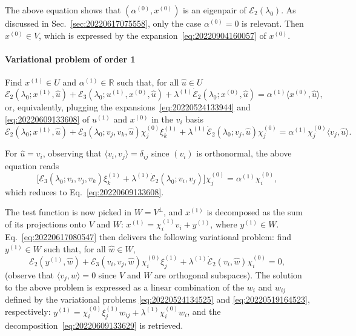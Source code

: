 \documentclass[12pt, final]{scrartcl}
\theoremstyle{definition}
\newcommand{\E}{\mathcal E}
\newcommand{\order}[2][1]{#2^{(#1)}}
\newcommand{\reals}{\mathbb{R}}
\begin{document}
The above equation shows that $(\order[0]\alpha, \order[0]x)$ is an eigenpair of $\E_2(\lambda_0)$. As discussed in
Sec.~\ref{sec:20220617075558}, only the case $\order[0]\alpha = 0$ is relevant. Then $\order[0]x \in V$, which is
expressed by the expansion~\eqref{eq:20220904160057} of $\order[0]x$.

\paragraph{Variational problem of order 1} Find $\order[1]x \in U$ and $\order[1]\alpha\in\reals$ such
that, for all $\hat{u} \in U$
\begin{equation}
  \label{eq:20220609131953}
  \E_2(\lambda_0; \order[1]x, \hat{u}) + \E_3(\lambda_0; \order[1]u, \order[0]x, \hat{u}) + \order[1]\lambda \dot{\E}_2(\lambda_0; \order[0]x, \hat{u})
  = \order[1]\alpha \langle \order[0]x, \hat{u} \rangle,
\end{equation}
or, equivalently, plugging the expansions~\eqref{eq:20220524133944} and \eqref{eq:20220609133608} of $\order[1]u$ and
$\order[0]x$ in the $v_i$ basis
\begin{equation}
  \label{eq:20220617080547}
  \E_2(\lambda_0; \order[1]x, \hat{u}) + \E_3(\lambda_0; v_j, v_k, \hat{u}) \order[0]{\chi_j} \order[1]{\xi_k} + \order[1]\lambda \dot{\E}_2(\lambda_0; v_j, \hat{u}) \order[0]{\chi_j}
  = \order[1]\alpha \order[0]{\chi_j} \langle v_j, \hat{u} \rangle.
\end{equation}

For $\hat{u} = v_i$, observing that $\langle v_i, v_j \rangle = \delta_{ij}$ since $(v_i)$ is orthonormal, the above
equation reads
\begin{equation}
  \bigl[\E_3(\lambda_0; v_i, v_j, v_k) \order[1]{\xi_k} + \order[1]\lambda \dot{\E}_2(\lambda_0; v_i, v_j)\bigr] \order[0]{\chi_j} = \order[1]\alpha \order[0]{\chi_i},
\end{equation}
which reduces to Eq.~\eqref{eq:20220609133608}.

The test function is now picked in $W = V^\perp$, and $\order[1]x$ is decomposed as the sum of its projections onto $V$
and $W$: $\order[1]x = \order[1]{\chi_i} v_i + \order[1]{y}$, where $\order[1]y \in W$. Eq.~\eqref{eq:20220617080547}
then delivers the following variational problem: find $\order[1]y \in W$ such that, for all $\hat{w} \in W$,
\begin{equation}
  \E_2(\order[1]y, \hat{w}) + \E_3(v_i, v_j, \hat{w}) \order[0]{\chi_i} \order[1]{\xi_j} + \order[1]\lambda \dot{\E}_2(v_i, \hat{w}) \order[0]{\chi_i} = 0,
\end{equation}
(observe that $\langle v_j, \hat{w} \rangle = 0$ since $V$ and $W$ are orthogonal subspaces). The solution to the above
problem is expressed as a linear combination of the $w_i$ and $w_{ij}$ defined by the variational problems
\eqref{eq:20220524134525} and \eqref{eq:20220519164523}, respectively:
$\order[1]y = \order[0]{\chi_i} \order[1]{\xi_j} w_{i j} + \order[1]\lambda \order[0]{\chi_i} w_i$, and the
decomposition~\eqref{eq:20220609133629} is retrieved.
\end{document}
